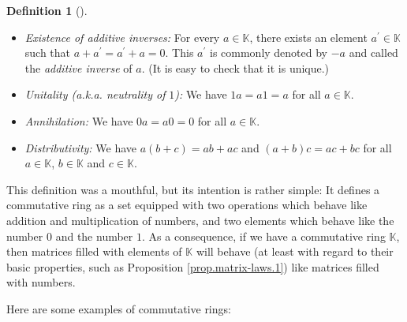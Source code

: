 \documentclass[numbers=enddot,12pt,final,onecolumn,notitlepage]{scrartcl}%
\theoremstyle{definition}
\newtheorem{defi}[theo]{Definition}
\newenvironment{definition}[1][]
{\begin{defi}[#1]\begin{leftbar}}
{\end{leftbar}\end{defi}}
\begin{document}
\begin{definition}
\begin{itemize}
\item \textit{Existence of additive inverses:} For every $a\in\mathbb{K}$,
there exists an element $a^{\prime}\in\mathbb{K}$ such that $a+a^{\prime
}=a^{\prime}+a=0$. This $a^{\prime}$ is commonly denoted by $-a$ and called
the \textit{additive inverse} of $a$. (It is easy to check that it is unique.)

\item \textit{Unitality (a.k.a. neutrality of }$1$\textit{):} We have
$1a=a1=a$ for all $a\in\mathbb{K}$.

\item \textit{Annihilation:} We have $0a=a0=0$ for all $a\in\mathbb{K}$.

\item \textit{Distributivity:} We have $a\left(  b+c\right)  =ab+ac$ and
$\left(  a+b\right)  c=ac+bc$ for all $a\in\mathbb{K}$, $b\in\mathbb{K}$ and
$c\in\mathbb{K}$.
\end{itemize}
\end{definition}

This definition was a mouthful, but its intention is rather simple: It defines
a commutative ring as a set equipped with two operations which behave like
addition and multiplication of numbers, and two elements which behave like the
number $0$ and the number $1$. As a consequence, if we have a commutative ring
$\mathbb{K}$, then matrices filled with elements of $\mathbb{K}$ will behave
(at least with regard to their basic properties, such as Proposition
\ref{prop.matrix-laws.1}) like matrices filled with numbers.

Here are some examples of commutative rings:
\end{document}
